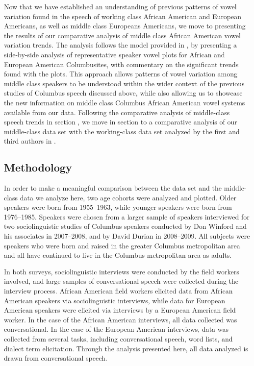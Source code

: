 \documentclass[output=paper,colorlinks,citecolor=brown]{langscibook}
\begin{document}
Now that we have established an understanding of previous patterns of vowel variation found in the speech of working class African American and European Americans, as well as middle class Europeans Americans, we move to presenting the results of our comparative analysis of middle class African American vowel variation trends. The analysis follows the model provided in \citet{Durianschumacher2010}, by presenting a side-by-side analysis of representative speaker vowel plots for African and European American Columbusites, with commentary on the significant trends found with the plots. This approach allows patterns of vowel variation among middle class speakers to be understood within the wider context of the previous studies of Columbus speech discussed above, while also allowing us to showcase the new information on middle class Columbus African American vowel systems available from our data. Following the comparative analysis of middle-class speech trends in section , we move in section  to a comparative analysis of our middle-class data set with the working-class data set analyzed by the first and third authors in \citet{Durianschumacher2010}.

\subsection{Methodology}
In order to make a meaningful comparison between the \citet{Durianschumacher2010} data set and the middle-class data we analyze here, two age cohorts were analyzed and plotted. Older speakers were born from 1955--1963, while younger speakers were born from 1976--1985. Speakers were chosen from a larger sample of speakers interviewed for two sociolinguistic studies of Columbus speakers conducted by Don Winford and his associates in 2007--2008, and by David Durian in 2008--2009. All subjects were speakers who were born and raised in the greater Columbus metropolitan area and all have continued to live in the Columbus metropolitan area as adults.

In both surveys, sociolinguistic interviews were conducted by the field workers involved, and large samples of conversational speech were collected during the interview process. African American field workers elicited data from African American speakers via sociolinguistic interviews, while data for European American speakers were elicited via interviews by a European American field worker. In the case of the African American interviews, all data collected was conversational. In the case of the European American interviews, data was collected from several tasks, including conversational speech, word lists, and dialect term elicitation. Through the analysis presented here, all data analyzed is drawn from conversational speech.
\end{document}
